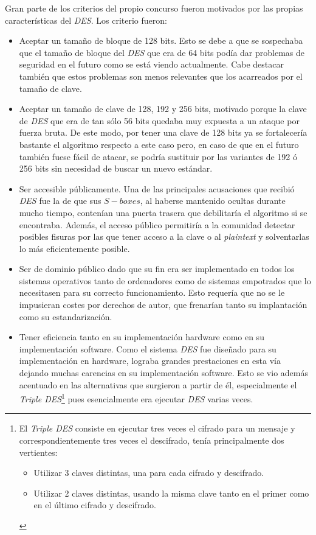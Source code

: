 Gran parte de los criterios del propio concurso fueron motivados por las propias características del \textit{DES}. Los criterio fueron:
\begin{itemize}
	\item Aceptar un tamaño de bloque de 128 bits. Esto se debe a que se sospechaba que el tamaño de bloque del \textit{DES} que era de 64 bits podía dar problemas de seguridad en el futuro como se está viendo actualmente. Cabe destacar también que estos problemas son menos relevantes que los acarreados por el tamaño de clave.

	\item Aceptar un tamaño de clave de 128, 192 y 256 bits, motivado porque la clave de \textit{DES} que era de tan sólo 56 bits quedaba muy expuesta a un ataque por fuerza bruta. De este modo, por tener una clave de 128 bits ya se fortalecería bastante el algoritmo respecto a este caso pero, en caso de que en el futuro también fuese fácil de atacar, se podría sustituir por las variantes de 192 ó 256 bits sin necesidad de buscar un nuevo estándar.
	
	\item Ser accesible públicamente. Una de las principales acusaciones que recibió \textit{DES} fue la de que sus $S-boxes$, al haberse mantenido ocultas durante mucho tiempo, contenían una puerta trasera que debilitaría el algoritmo si se encontraba. Además, el acceso público permitiría a la comunidad detectar posibles fisuras por las que tener acceso a la clave o al \textit{plaintext} y solventarlas lo más eficientemente posible.
	
	\item Ser de dominio público dado que su fin era ser implementado en todos los sistemas operativos tanto de ordenadores como de sistemas empotrados que lo necesitasen para su correcto funcionamiento. Esto requería que no se le impusieran costes por derechos de autor, que frenarían tanto su implantación como su estandarización.
	
	\item Tener eficiencia tanto en su implementación hardware como en su implementación software. Como el sistema \textit{DES} fue diseñado para su implementación en hardware, lograba grandes prestaciones en esta vía dejando muchas carencias en su implementación software. Esto se vio además acentuado en las alternativas que surgieron a partir de él, especialmente el \textit{Triple DES}\footnote{El \textit{Triple DES} consiste en ejecutar tres veces el cifrado para un mensaje y correspondientemente tres veces el descifrado, tenía principalmente dos vertientes:
	\begin{itemize}
		\item Utilizar 3 claves distintas, una para cada cifrado y descifrado.
		\item Utilizar 2 claves distintas, usando la misma clave tanto en el primer como en el último cifrado y descifrado.
	\end{itemize}} pues esencialmente era ejecutar \textit{DES} varias veces.
\end{itemize}

